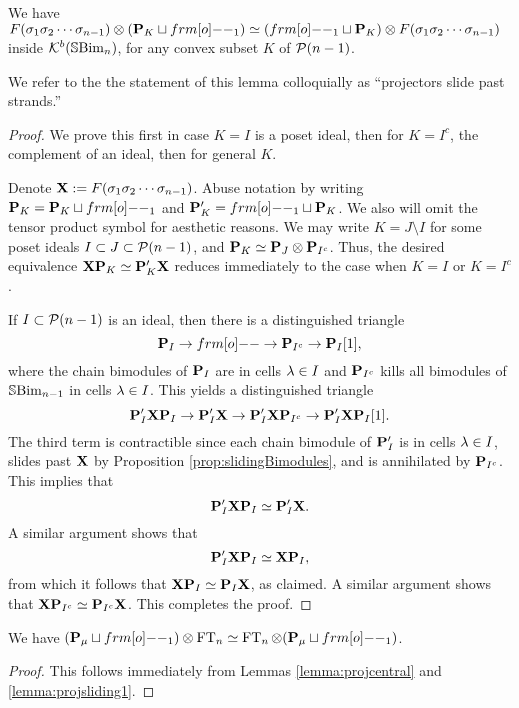 \begin{lemma}\label{lemma:projsliding1}
We have $F(\sigma_1\sigma_2\cdots\sigma_{n-1})\otimes (\PB_K\sqcup \one_1)\simeq (\one_1\sqcup \PB_K)\otimes F(\sigma_1\sigma_2\cdots \sigma_{n-1})$ inside ${\mathcal{K}}^b({\mathbb{S}}{\rm Bim }_{n})$, for any convex subset $K$ of ${\mathcal{P}}(n-1)$.
\end{lemma}
We refer to the the statement of this lemma colloquially as ``projectors slide past strands.''
\begin{proof}
We prove this first in case $K=I$ is a poset ideal, then for $K=I^c$, the complement of an ideal, then for general $K$.

Denote ${\mathbf X}:=F(\sigma_1\sigma_2\cdots \sigma_{n-1})$.  Abuse notation by writing $\PB_K = \PB_K\sqcup \one_1$ and $\PB_K'=\one_1\sqcup \PB_K$.  We also will omit the tensor product symbol for aesthetic reasons.  We may write $K=J\setminus I$ for some poset ideals $I\subset J\subset {\mathcal{P}}(n-1)$, and ${\mathbf P}_K \simeq {\mathbf P}_J\otimes {\mathbf P}_{I^c}$. Thus, the desired equivalence ${\mathbf X} {\mathbf P}_K\simeq {\mathbf P}_K'{\mathbf X}$ reduces immediately to the case when $K=I$ or $K=I^c$.

If $I\subset {\mathcal{P}}(n-1)$ is an ideal, then there is a distinguished triangle
\[
\PB_I\rightarrow \one \rightarrow \PB_{I^c}\rightarrow \PB_I[1],
\]
where the chain bimodules of ${\mathbf P}_{I}$ are in cells $\lambda\in I$ and ${\mathbf P}_{I^c}$ kills all bimodules of ${\mathbb{S}}{\rm Bim }_{n-1}$ in cells  $\lambda\in I$.  This yields a distinguished triangle
\[
{\mathbf P}_I' {\mathbf X} {\mathbf P}_I\rightarrow {\mathbf P}_I' {\mathbf X} \rightarrow {\mathbf P}_I'{\mathbf X} {\mathbf P}_{I^c}\rightarrow {\mathbf P}_I'{\mathbf X} {\mathbf P}_I[1].
\]
The third term is contractible since each chain bimodule of ${\mathbf P}_{I}'$ is in cells $\lambda\in I$, slides past ${\mathbf X}$ by Proposition \ref{prop:slidingBimodules}, and is annihilated by ${\mathbf P}_{I^c}$.  This implies that
\[
{\mathbf P}_I'{\mathbf X}{\mathbf P}_I \simeq {\mathbf P}_I'{\mathbf X}.
\]
A similar argument shows that
\[
{\mathbf P}_I'{\mathbf X}{\mathbf P}_I \simeq {\mathbf X}{\mathbf P}_I,
\]
from which it follows that ${\mathbf X}{\mathbf P}_I\simeq {\mathbf P}_I{\mathbf X}$, as claimed.  A similar argument shows that ${\mathbf X}{\mathbf P}_{I^c}\simeq {\mathbf P}_{I^c}{\mathbf X}$.   This completes the proof.
\end{proof}

\begin{lemma}\label{lemma:projectorSliding}
We have $(\PB_{\mu}\sqcup \one_1)\otimes \FT_n \simeq \FT_n\otimes (\PB_{\mu} \sqcup \one_1)$.
\end{lemma}
\begin{proof}
This follows immediately from Lemmas \ref{lemma:projcentral} and \ref{lemma:projsliding1}.
\end{proof}


